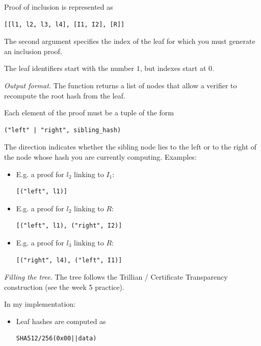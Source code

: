 \documentclass{homework}
\begin{document}
\begin{task}{Proof of inclusion}
  is represented as
  \begin{Verbatim}
[[l1, l2, l3, l4], [I1, I2], [R]]
  \end{Verbatim}

  The second argument specifies the index of the leaf for which you must generate an inclusion proof.
  \begin{tcolorbox}[title=NB!]
    The leaf identifiers start with the number $1$, but indexes start at $0$.
  \end{tcolorbox}

  \textit{Output format.}
  The function returns a list of nodes that allow a verifier to recompute the root hash from the leaf.

  Each element of the proof must be a tuple of the form

  \begin{Verbatim}
("left" | "right", sibling_hash)
  \end{Verbatim}

  The direction indicates whether the sibling node lies to the left or to the right of the node whose hash you are currently computing.
  Examples:
  \begin{itemize}
    \item E.g. a proof for $l_2$ linking to $I_1$:
    \begin{Verbatim}
[("left", l1)]
    \end{Verbatim}

    \item E.g. a proof for $l_2$ linking to $R$:
    \begin{Verbatim}
[("left", l1), ("right", I2)]
    \end{Verbatim}

    \item E.g. a proof for $l_3$ linking to $R$:
    \begin{Verbatim}
[("right", l4), ("left", I1)]
    \end{Verbatim}
  \end{itemize}

  \textit{Filling the tree.}
  The tree follows the Trillian / Certificate Transparency construction (see the week 5 practice).

  In my implementation:
  \begin{itemize}
    \item Leaf hashes are computed as
    \begin{Verbatim}
SHA512/256(0x00||data)
    \end{Verbatim}


\end{itemize}
\end{task}
\end{document}
